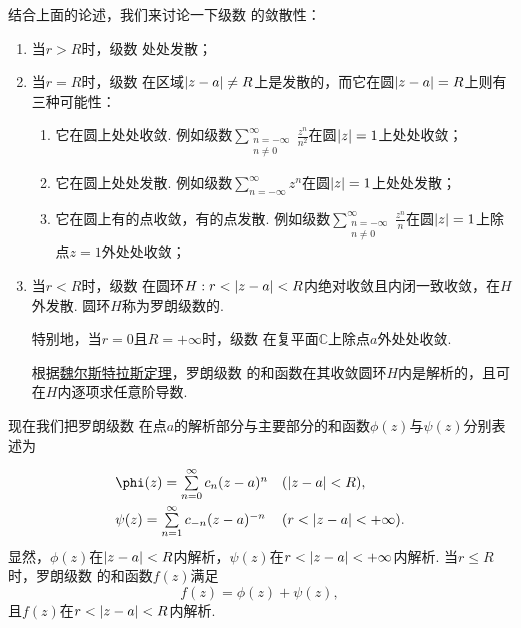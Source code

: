 结合上面的论述，我们来讨论一下级数  的敛散性：
\begin{enumerate}
\item 当\(r > R\)时，级数  处处发散；

\item 当\(r = R\)时，级数  在区域\(\abs{z-a} \neq R\)上是发散的，而它在圆\(\abs{z-a}=R\)上则有三种可能性：\begin{enumerate}
\item 它在圆上处处收敛.
例如级数\(\sum\limits_{\substack{n=-\infty \\ n\neq0}}^\infty \frac{z^n}{n^2}\)在圆\(\abs{z}=1\)上处处收敛；

\item 它在圆上处处发散.
例如级数\(\sum\limits_{n=-\infty}^\infty z^n\)在圆\(\abs{z}=1\)上处处发散；

\item 它在圆上有的点收敛，有的点发散.
例如级数\(\sum\limits_{\substack{n=-\infty \\ n\neq0}}^\infty \frac{z^n}{n}\)在圆\(\abs{z}=1\)上除点\(z=1\)外处处收敛；
\end{enumerate}

\item 当\(r < R\)时，级数  在圆环\(H: r < \abs{z-a} < R\)内绝对收敛且内闭一致收敛，在\(H\)外发散.
圆环\(H\)称为罗朗级数的.

特别地，当\(r = 0\)且\(R = +\infty\)时，级数  在复平面\(\mathbb{C}\)上除点\(a\)外处处收敛.

根据\hyperref[theorem:解析函数的级数表示.魏尔斯特拉斯定理]{魏尔斯特拉斯定理}，罗朗级数  的和函数在其收敛圆环\(H\)内是解析的，且可在\(H\)内逐项求任意阶导数.
\end{enumerate}

现在我们把罗朗级数  在点\(a\)的解析部分与主要部分的和函数\(\phi(z)\)与\(\psi(z)\)分别表述为\[
\def\arraystretch{2}
\begin{array}{ll}
\phi(z) = \sum\limits_{n=0}^\infty c_n (z-a)^n & (\abs{z-a}<R), \\
\psi(z) = \sum\limits_{n=1}^\infty c_{-n} (z-a)^{-n} & (r < \abs{z-a} < +\infty).
\end{array}
\]显然，\(\phi(z)\)在\(\abs{z-a}<R\)内解析，\(\psi(z)\)在\(r<\abs{z-a}<+\infty\)内解析.
当\(r \leq R\)时，罗朗级数  的和函数\(f(z)\)满足\[
f(z) = \phi(z) + \psi(z),
\]且\(f(z)\)在\(r<\abs{z-a}<R\)内解析.

